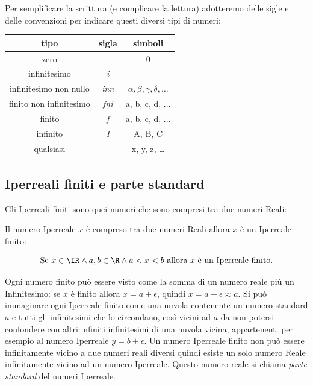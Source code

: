 Per semplificare la scrittura (e complicare la lettura) adotteremo delle 
sigle e delle convenzioni per indicare questi diversi tipi di numeri:

\begin{center}
\begin{tabular}{ccc}\toprule
tipo & sigla & simboli\\\midrule
zero &  & 0\\
infinitesimo & \emph{i} & \\
infinitesimo non nullo & \emph{inn} & $\alpha, \beta, \gamma, \delta, \dots$\\
finito non infinitesimo& \emph{fni} & a, b, c, d, ...\\
finito & \emph{f} & a, b, c, d, ...\\
infinito & \emph{I} & A, B, C\\
qualsiasi &  & x, y, z, \ldots\\\bottomrule
\end{tabular}
\label{tab:insnum_tipi}
\end{center}

\subsection{Iperreali finiti e parte standard}
\label{subsec:insnum_partestandard}

Gli Iperreali finiti sono quei numeri che sono compresi tra due numeri Reali:

\begin{definizione}
 Il numero Iperreale $x$ è compreso tra due numeri Reali allora $x$ è un 
Iperreale finito:

\[\text{Se } x \in \IR \wedge a, b \in \R \wedge 
  a < x < b \text{ allora } x \text{ è un Iperreale finito.}\]
\end{definizione}

Ogni numero finito può essere visto come la somma di un numero reale più un 
Infinitesimo: se $x$ è finito allora $x = a + \epsilon$, quindi 
$x=a+\epsilon\approx a$. Si può immaginare ogni Iperreale finito come una
nuvola contenente un numero standard $a$ e tutti gli infinitesimi che lo 
circondano, così vicini ad $a$ da non potersi confondere con altri infiniti
infinitesimi di una nuvola vicina, appartenenti per esempio al numero 
Iperreale
$y=b+\epsilon$. Un numero Iperreale finito non può essere infinitamente 
vicino 
a due numeri reali diversi quindi esiste un solo numero Reale infinitamente 
vicino ad un numero Iperreale. 
Questo numero reale si chiama \emph{parte standard} del numeri Iperreale.

